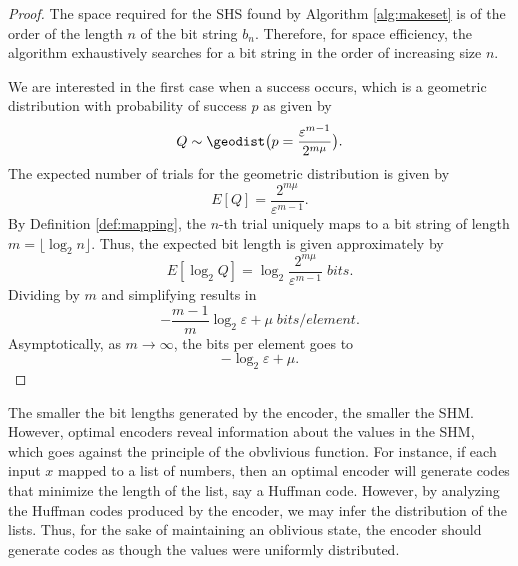 \documentclass[
]{article}
\theoremstyle{definition}
\theoremstyle{definition}
\theoremstyle{definition}
\theoremstyle{definition}
\theoremstyle{remark}
\begin{document}
\begin{proof}
The space required for the SHS found by Algorithm \ref{alg:makeset} is of the order of the length \(n\) of the bit string \(b_n\). Therefore, for space efficiency, the algorithm exhaustively searches for a bit string in the order of increasing size \(n\).

We are interested in the first case when a success occurs, which is a geometric distribution with probability of success \(p\) as given by
\begin{equation}
    Q \sim \geodist\bigl(p = \frac{\varepsilon^{m-1}}{2^{m \mu}}\bigr).
\end{equation}
The expected number of trials for the geometric distribution is given by
\begin{equation}
\label{eq:exp_trials}
    E[Q] = \frac{2^{m \mu}}{\varepsilon^{m-1}}.
\end{equation}
By Definition \ref{def:mapping}, the \(n\)-th trial uniquely maps to a bit string of length \(m = \lfloor \log_2 n \rfloor\). Thus, the expected bit length is given approximately by
\begin{equation}
    E[\log_2 Q] = \log_2 \frac{2^{m \mu}}{\varepsilon^{m-1}}\; \si{bits}.
\end{equation}
Dividing by \(m\) and simplifying results in
\begin{equation}
    -\frac{m-1}{m} \log_2 \varepsilon + \mu\; \si{bits \per element}.
\end{equation}
Asymptotically, as \(m \to \infty\), the bits per element goes to
\begin{equation}
    -\log_2 \varepsilon + \mu.
\end{equation}
\end{proof}

The smaller the bit lengths generated by the encoder, the smaller the SHM. However, optimal encoders reveal information about the values in the SHM, which goes against the principle of the obvlivious function. For instance, if each input \(x\) mapped to a list of numbers, then an optimal encoder will generate codes that minimize the length of the list, say a Huffman code. However, by analyzing the Huffman codes produced by the encoder, we may infer the distribution of the lists. Thus, for the sake of maintaining an oblivious state, the encoder should generate codes as though the values were uniformly distributed.
\end{document}

